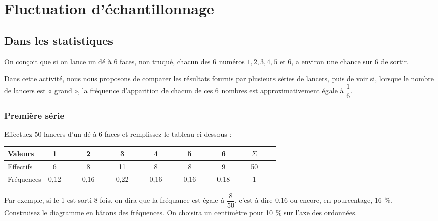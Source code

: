 \ifdefined\COMPLETE
\else
    
    
\fi

\section{Fluctuation d'échantillonnage}

\subsection{Dans les statistiques}

On conçoit que si on lance un dé à 6 faces, non truqué, chacun des 6 numéros $1, 2, 3, 4, 5$  et $ 6$,  a environ une chance sur 6 de sortir.

Dans cette activité, nous nous proposons de comparer les résultats fournis par plusieurs séries de lancers, puis de voir si, lorsque le nombre de lancers est « grand », la fréquence d'apparition de chacun de ces 6 nombres est approximativement égale à $\dfrac{1}{6}$. 

\subsubsection*{Première série}

Effectuez 50 lancers d'un dé à 6 faces et remplissez le tableau ci-dessous : \\

\begin{tabular}{|l|ccc|ccc|ccc|ccc|ccc|ccc|ccc|}
\hline
Valeurs & 1 & & & 2 & & & 3 & & & 4 & & & 5 & & & 6 & & & $\Sigma$ & &  \\
\hline
Effectifs & 6 & & & 8 & & & 11 & & & 8 & & & 8 & & & 9 & & & 50 & & \\
\hline
Fréquences & 0,12 & & & 0,16 & & & 0,22 & & & 0,16 & & & 0,16 & & & 0,18 & & & 1 & & \\
\hline
\end{tabular}

\vspace*{.3cm}

Par exemple, si le 1 est sorti 8 fois, on dira que la fréquance est égale à $\dfrac{8}{50}$, c'est-à-dire 0,16 ou encore, en pourcentage, 16 \%. \\

Construisez le diagramme en bâtons des fréquences. On choisira un centimètre pour 10 \% sur l'axe des ordonnées.


